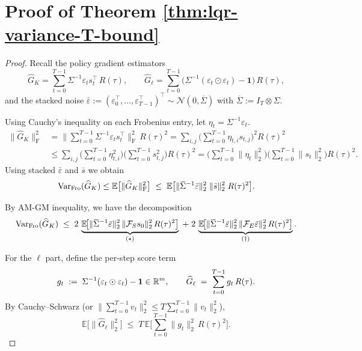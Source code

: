 \section{Proof of Theorem \ref{thm:lqr-variance-T-bound}}
\label{sec:app-proof-lqr-variance-T-bound}

\begin{proof}
   Recall the policy gradient estimators
\[
\widehat G_K
=\sum_{t=0}^{T-1}\Sigma^{-1}\varepsilon_t s_t^\top\,R(\tau),
\qquad
\widehat G_{\ell}
=\sum_{t=0}^{T-1}\Big(\Sigma^{-1}(\varepsilon_t\odot \varepsilon_t)-\mathbf 1\Big)\,R(\tau),
\]
and the stacked noise $\bar\varepsilon:=(\varepsilon_0^\top,\dots,\varepsilon_{T-1}^\top)^\top\sim\mathcal N(0,\overline\Sigma)$
with $\overline\Sigma:=I_T\otimes\Sigma$.
   
   Using Cauchy’s inequality on each Frobenius entry, let $\eta_t = \Sigma^{-1}\varepsilon_t$.
   \begin{align*}
   \|\widehat G_K\|_{\mathrm{F}}^2
   &=\Big\|\sum_{t=0}^{T-1}\Sigma^{-1}\varepsilon_t s_t^\top\Big\|_{\mathrm{F}}^2\,R(\tau)^2
   = \sum_{i,j}\Big(\sum_{t=0}^{T-1} \eta_{t,i}s_{t,j}\Big)^2 R(\tau)^2 \\
   &\le \sum_{i,j}
      \Big(\sum_{t=0}^{T-1} \eta_{t,i}^2\Big)
      \Big(\sum_{t=0}^{T-1} s_{t,j}^2\Big) R(\tau)^2
   = \Big(\sum_{t=0}^{T-1} \|\eta_t\|_2^2\Big)
      \Big(\sum_{t=0}^{T-1} \|s_t\|_2^2\Big) R(\tau)^2.
   \end{align*}
   Using stacked $\bar\varepsilon$ and $\bar s$ we obtain
   \begin{equation}
   \label{eq:second-moment-global}
   \VarF(\widehat G_K) \le \mathbb E\big[\|\widehat G_K\|_{\mathrm{F}}^2\big]
   \;\le\;
   \mathbb E\big[\|\overline\Sigma^{-1}\bar\varepsilon\|_2^2\;\|\bar s\|_2^2\;R(\tau)^2\big].
   \end{equation}

   By AM-GM inequality, we have the decomposition
   \begin{equation}
      \VarF(\widehat G_K)
      \;\le\;2\,\underbrace{\mathbb E\!\big[\|\overline\Sigma^{-1}\bar\varepsilon\|_2^2\,
                                 \|\mathcal F_S s_0\|_2^2\,R(\tau)^{2}\big]}_{(\star)}
      \;+\;2\,\underbrace{\mathbb E\!\big[\|\overline\Sigma^{-1}\bar\varepsilon\|_2^2\,
                                 \|\mathcal F_E\bar\varepsilon\|_2^2\,R(\tau)^{2}\big]}_{(\dagger)} .
    \end{equation}

   For the $\ell$ part, define the per-step score term
\[
g_t \;:=\;\Sigma^{-1}(\varepsilon_t\odot \varepsilon_t)-\mathbf 1\in\mathbb{R}^m,
\qquad
\widehat G_\ell \;=\;\sum_{t=0}^{T-1} g_t\,R(\tau).
\]
By Cauchy--Schwarz (or $\|\sum_{t=0}^{T-1}v_t\|_2^2\le T\sum_{t=0}^{T-1}\|v_t\|_2^2$),
\begin{equation}\label{eq:ell-second-moment-global}
\mathbb E\big[\|\widehat G_\ell\|_2^2\big]
\;\le\;
T\,\mathbb E\big[\sum_{t=0}^{T-1}\|g_t\|_2^2\,R(\tau)^2\big].
\end{equation}


\end{proof}
